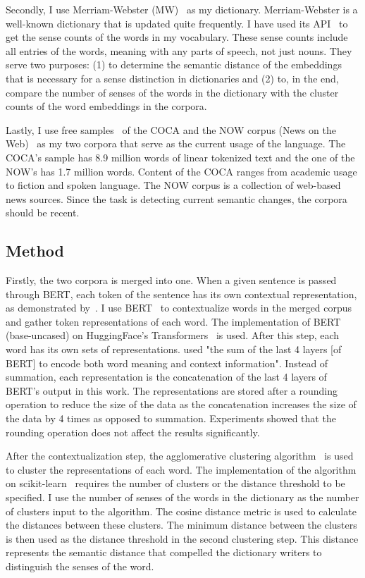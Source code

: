 \documentclass[11pt]{article}
\begin{document}
Secondly, I use Merriam-Webster (MW)~\cite{mw-2023-dictionary} as my dictionary.
Merriam-Webster is a well-known dictionary that is updated quite frequently.
I have used its API~\cite{mw-2023-api} to get the sense counts of the words in my vocabulary.
These sense counts include all entries of the words, meaning with any parts of speech, not just nouns.
They serve two purposes: (1) to determine the semantic distance of the embeddings that is necessary for a sense distinction in dictionaries and (2) to, in the end, compare the number of senses of the words in the dictionary with the cluster counts of the word embeddings in the corpora.

Lastly, I use free samples~\cite{corpus-data-2023-corpora} of the COCA and the NOW corpus (News on the Web)~\cite{english-corpora-2016-now} as my two corpora that serve as the current usage of the language.
The COCA's sample has 8.9 million words of linear tokenized text and the one of the NOW's has 1.7 million words.
Content of the COCA ranges from academic usage to fiction and spoken language.
The NOW corpus is a collection of web-based news sources.
Since the task is detecting current semantic changes, the corpora should be recent.

\subsection{Method}

Firstly, the two corpora is merged into one.
When a given sentence is passed through BERT, each token of the sentence has its own contextual representation, as demonstrated by~\cite{pasini-etal-2020-clubert}.
I use BERT~\cite{devlin-etal-2019-bert} to contextualize words in the merged corpus and gather token representations of each word.
The implementation of BERT (base-uncased) on HuggingFace's Transformers~\cite{wolf-etal-2020-transformers} is used.
After this step, each word has its own sets of representations.
\cite{zhou-li-2020-temporalteller} used "the sum of the last 4 layers [of BERT] to encode both word meaning and context information".
Instead of summation, each representation is the concatenation of the last 4 layers of BERT's output in this work.
The representations are stored after a rounding operation to reduce the size of the data as the concatenation increases the size of the data by 4 times as opposed to summation.
Experiments showed that the rounding operation does not affect the results significantly.

After the contextualization step, the agglomerative clustering algorithm~\cite{Florek1951SurLL} is used to cluster the representations of each word.
The implementation of the algorithm on scikit-learn~\cite{scikit-learn} requires the number of clusters or the distance threshold to be specified.
I use the number of senses of the words in the dictionary as the number of clusters input to the algorithm.
The cosine distance metric is used to calculate the distances between these clusters.
The minimum distance between the clusters is then used as the distance threshold in the second clustering step.
This distance represents the semantic distance that compelled the dictionary writers to distinguish the senses of the word.
\end{document}
